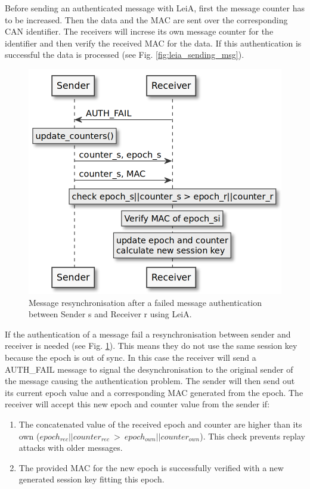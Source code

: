 Before sending an authenticated message with LeiA, first the message counter has
to be increased. Then the data and the MAC are sent over the corresponding CAN
identifier. The receivers will increse its own message counter for the
identifier and then verify the received MAC for the data. If this authentication
is successful the data is processed (see Fig. \ref{fig:leia_sending_msg}).

\begin{figure}[h]
    \centering
    \captionsetup{justification=centering}
	\includegraphics[width=1\linewidth]{Figures/LeiA_resync.png}
    \caption[]{Message resynchronisation after a failed message authentication 
    between Sender s and Receiver r using LeiA.}
	\label{fig:leia_resync}
\end{figure}

If the authentication of a message fail a resynchronisation between sender and
receiver is needed (see Fig. \ref{fig:leia_resync}). This means they do not use
the same session key because the epoch is out of sync. In this case the receiver
will send a AUTH\_FAIL message to signal the desynchronisation to the original
sender of the message causing the authentication problem. The sender will then
send out its current epoch value and a corresponding MAC generated from the
epoch. The receiver will accept this new epoch and counter value from the sender
if:

\begin{enumerate}
    \item The concatenated value of the received epoch and counter are higher
    than its own ($ epoch_{rec} || counter_{rec}~>~epoch_{own} || counter_{own}
    $). This check prevents replay attacks with older messages. 
    \item The provided MAC for the new epoch is successfully verified with a new
    generated session key fitting this epoch.
\end{enumerate}


